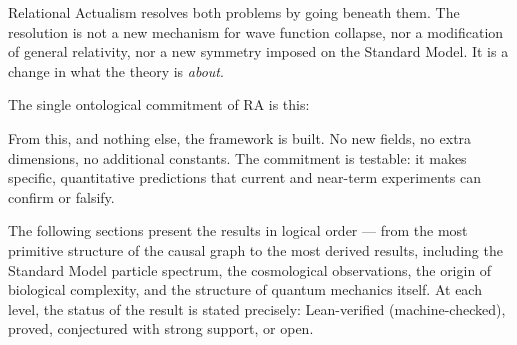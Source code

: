 \documentclass[11pt,a4paper]{article}
\begin{document}
Relational Actualism resolves both problems by going beneath them. The resolution
is not a new mechanism for wave function collapse, nor a modification of
general relativity, nor a new symmetry imposed on the Standard Model.
It is a change in what the theory is \emph{about}.

The single ontological commitment of RA is this:

\medskip
\begin{center}
\end{center}
\medskip

From this, and nothing else, the framework is built. No new fields, no extra
dimensions, no additional constants. The commitment is testable: it makes
specific, quantitative predictions that current and near-term experiments can
confirm or falsify.

The following sections present the results in logical order --- from the most
primitive structure of the causal graph to the most derived results, including
the Standard Model particle spectrum, the cosmological observations, the origin
of biological complexity, and the structure of quantum mechanics itself.
At each level, the status of the result is stated precisely: Lean-verified
(machine-checked), proved, conjectured with strong support, or open.
\end{document}
